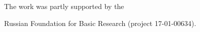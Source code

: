  









\Ack

\noindent

The work was partly supported by the

Russian Foundation for Basic Research (project 17-01-00634).

 





\renewcommand{\bibname}{\protect\rmfamily References}




